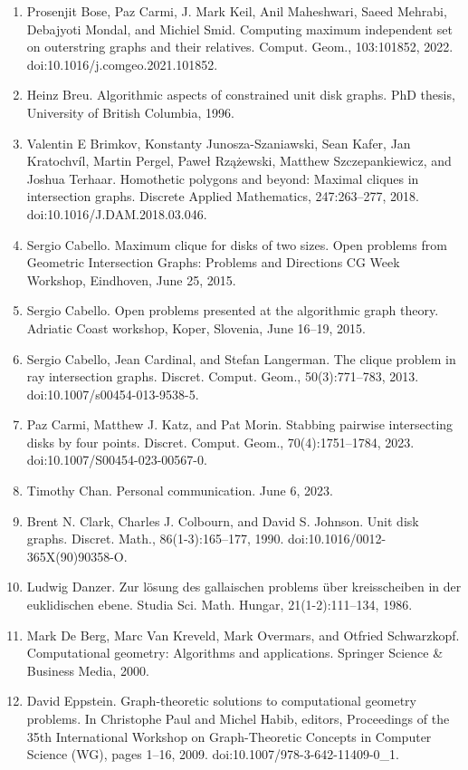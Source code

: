\begin{enumerate}
\item[]  [8]  Prosenjit Bose, Paz Carmi, J. Mark Keil, Anil Maheshwari, Saeed Mehrabi, Debajyoti Mondal, and Michiel Smid.  Computing maximum independent set on outerstring graphs and their relatives.  Comput. Geom., 103:101852, 2022.  doi:10.1016/j.comgeo.2021.101852.  
\item[]  [9]  Heinz Breu.  Algorithmic aspects of constrained unit disk graphs.  PhD thesis, University of British Columbia, 1996.  
\item[]  [10]  Valentin E Brimkov, Konstanty Junosza-Szaniawski, Sean Kafer, Jan Kratochvíl, Martin Pergel, Paweł Rzążewski, Matthew Szczepankiewicz, and Joshua Terhaar.  Homothetic polygons and beyond: Maximal cliques in intersection graphs.  Discrete Applied Mathematics, 247:263–277, 2018.  doi:10.1016/J.DAM.2018.03.046.  
\item[]  [11]  Sergio Cabello.  Maximum clique for disks of two sizes.  Open problems from Geometric Intersection Graphs: Problems and Directions CG Week Workshop, Eindhoven, June 25, 2015.  
\item[]  [12]  Sergio Cabello.  Open problems presented at the algorithmic graph theory.  Adriatic Coast workshop, Koper, Slovenia, June 16–19, 2015.  
\item[]  [13]  Sergio Cabello, Jean Cardinal, and Stefan Langerman.  The clique problem in ray intersection graphs.  Discret. Comput. Geom., 50(3):771–783, 2013.  doi:10.1007/s00454-013-9538-5.  
\item[]  [14]  Paz Carmi, Matthew J. Katz, and Pat Morin.  Stabbing pairwise intersecting disks by four points.  Discret. Comput. Geom., 70(4):1751–1784, 2023.  doi:10.1007/S00454-023-00567-0.  
\item[]  [15]  Timothy Chan.  Personal communication.  June 6, 2023.  
\item[]  [16]  Brent N. Clark, Charles J. Colbourn, and David S. Johnson.  Unit disk graphs.  Discret. Math., 86(1-3):165–177, 1990.  doi:10.1016/0012-365X(90)90358-O.  
\item[]  [17]  Ludwig Danzer.  Zur lösung des gallaischen problems über kreisscheiben in der euklidischen ebene.  Studia Sci. Math. Hungar, 21(1-2):111–134, 1986.  
\item[]  [18]  Mark De Berg, Marc Van Kreveld, Mark Overmars, and Otfried Schwarzkopf.  Computational geometry: Algorithms and applications.  Springer Science \& Business Media, 2000.  
\item[]  [19]  David Eppstein.  Graph-theoretic solutions to computational geometry problems.  In Christophe Paul and Michel Habib, editors, Proceedings of the 35th International Workshop on Graph-Theoretic Concepts in Computer Science (WG), pages 1–16, 2009.  doi:10.1007/978-3-642-11409-0\_1.  

\end{enumerate}
